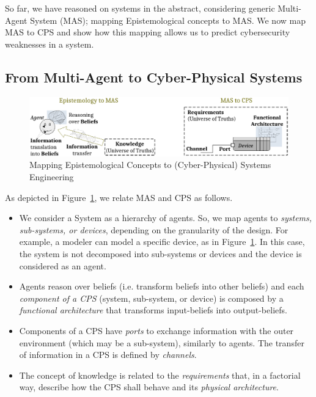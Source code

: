 \documentclass[conference]{IEEEtran}
\begin{document}
So far, we have reasoned on systems in the abstract, considering
generic Multi-Agent System (MAS); mapping Epistemological concepts
to MAS. We now map MAS to CPS and show how this mapping allows us
to predict cybersecurity weaknesses in a system.

\subsection{From Multi-Agent to Cyber-Physical Systems}
\begin{figure}[t]
	\centering
	\includegraphics[width=.8\textwidth]{mashyp.pdf}
	\caption{Mapping Epistemological Concepts to (Cyber-Physical) Systems Engineering}
	\label{fig:mashyp}
\end{figure}

As depicted in Figure~\ref{fig:mashyp}, we relate MAS and CPS as follows.
\begin{itemize}
	\item We consider a System as a hierarchy of agents. So, we map agents
		to \emph{systems, sub-systems, or devices}, depending on the
		granularity of the design. For example, a modeler can model a
		specific device, as in Figure~\ref{fig:mashyp}. In this case,
		the system is not decomposed into sub-systems or devices and
		the device is considered as an agent.
	\item Agents reason over beliefs (i.e. transform beliefs into other
		beliefs) and each \emph{component of a CPS} (system, sub-system,
		or device) is composed by a \emph{functional architecture} that
		transforms input-beliefs into output-beliefs.
	\item Components of a CPS have \emph{ports} to exchange information
		with the outer environment (which may be a sub-system),
		similarly to agents. The transfer of information in a CPS is
		defined by \emph{channels}.
	\item The concept of knowledge is related to the \emph{requirements}
		that, in a factorial way, describe how the CPS shall behave and
		its \emph{physical architecture}.

\end{itemize}
\end{document}
